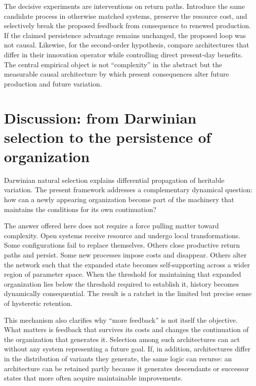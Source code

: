 \documentclass[11pt]{article}
\begin{document}
The decisive experiments are interventions on return paths. Introduce the same candidate process in otherwise matched systems, preserve the resource cost, and selectively break the proposed feedback from consequence to renewed production. If the claimed persistence advantage remains unchanged, the proposed loop was not causal. Likewise, for the second-order hypothesis, compare architectures that differ in their innovation operator while controlling direct present-day benefits. The central empirical object is not ``complexity'' in the abstract but the measurable causal architecture by which present consequences alter future production and future variation.

\section{Discussion: from Darwinian selection to the persistence of organization}

Darwinian natural selection explains differential propagation of heritable variation. The present framework addresses a complementary dynamical question: how can a newly appearing organization become part of the machinery that maintains the conditions for its own continuation?

The answer offered here does not require a force pulling matter toward complexity. Open systems receive resource and undergo local transformations. Some configurations fail to replace themselves. Others close productive return paths and persist. Some new processes impose costs and disappear. Others alter the network such that the expanded state becomes self-supporting across a wider region of parameter space. When the threshold for maintaining that expanded organization lies below the threshold required to establish it, history becomes dynamically consequential. The result is a ratchet in the limited but precise sense of hysteretic retention.

This mechanism also clarifies why ``more feedback'' is not itself the objective. What matters is feedback that survives its costs and changes the continuation of the organization that generates it. Selection among such architectures can act without any system representing a future goal. If, in addition, architectures differ in the distribution of variants they generate, the same logic can recurse: an architecture can be retained partly because it generates descendants or successor states that more often acquire maintainable improvements.
\end{document}
